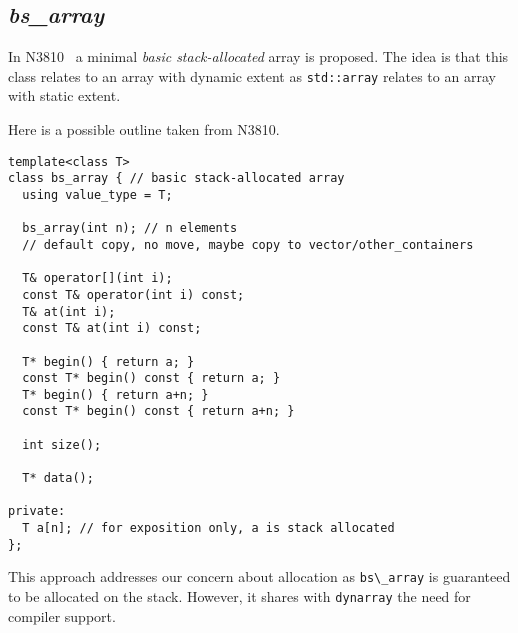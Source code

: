 \subsection{\emph{bs\_array}}

In N3810~\cite{n3810} a minimal \emph{basic stack-allocated} array is proposed.
The idea is that this class relates to an array with dynamic extent as
\verb+std::array+ relates to an array with static extent.

Here is a possible outline taken from N3810.

\begin{lstlisting}
template<class T>
class bs_array { // basic stack-allocated array
  using value_type = T;

  bs_array(int n); // n elements
  // default copy, no move, maybe copy to vector/other_containers

  T& operator[](int i); 
  const T& operator(int i) const; 
  T& at(int i); 
  const T& at(int i) const; 

  T* begin() { return a; } 
  const T* begin() const { return a; }
  T* begin() { return a+n; }
  const T* begin() const { return a+n; }

  int size();

  T* data();

private:
  T a[n]; // for exposition only, a is stack allocated
};
\end{lstlisting}

This approach addresses our concern about allocation as \verb+bs\_array+ is
guaranteed to be allocated on the stack. However, it shares with \verb+dynarray+
the need for compiler support.
